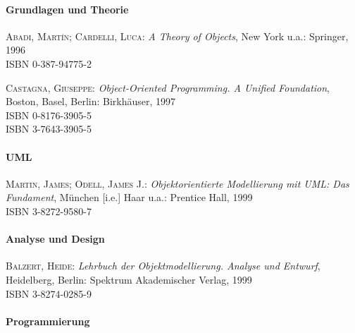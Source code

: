 \paragraph{Grundlagen und Theorie}

\begin{description}

\item \textsc{Abadi, Mart\'{\i}n; Cardelli, Luca}:
\textit{A Theory of Objects},
New York u.a.: Springer, 1996 \\
ISBN 0-387-94775-2

\item \textsc{Castagna, Giuseppe}:
\textit{Object-Oriented Programming. A Unified Foundation},
Boston, Basel, Berlin: Birkh\"auser, 1997 \\
ISBN 0-8176-3905-5 \\
ISBN 3-7643-3905-5

\end{description}

\paragraph{UML}

\begin{description}

\item \textsc{Martin, James; Odell, James J.}:
\textit{Objektorientierte Modellierung mit UML: Das Fundament},
M\"unchen [i.e.] Haar u.a.: Prentice Hall, 1999 \\
ISBN 3-8272-9580-7

\end{description}

\paragraph{Analyse und Design}

\begin{description}
  
\item \textsc{Balzert, Heide}: \textit{Lehrbuch der
    Objektmodellierung. Analyse und Entwurf},
  Heidelberg, Berlin: Spektrum Akademischer Verlag, 1999 \\
  ISBN 3-8274-0285-9

\end{description}

\paragraph{Programmierung}


